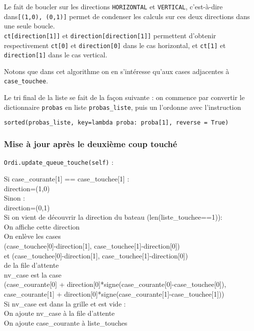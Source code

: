 Le fait de boucler sur les directions \texttt{HORIZONTAL} et \texttt{VERTICAL}, c'est-à-dire dans\texttt{[(1,0), (0,1)]} permet de condenser les calculs sur ces deux directions dans une seule boucle.\\
\texttt{ct[direction[1]]} et \texttt{direction[direction[1]]} permettent d'obtenir respectivement \texttt{ct[0]} et \texttt{direction[0]} dans le cas horizontal, et \texttt{ct[1]} et \texttt{direction[1]} dans le cas vertical.

Notons que dans cet algorithme on en s'intéresse qu'aux cases adjacentes à \texttt{case\_touchee}.

\medskip

Le tri final de la liste se fait de la façon suivante : on commence par convertir le dictionnaire \texttt{probas} en liste \texttt{probas\_liste}, puis un l'ordonne avec l'instruction
\begin{center}
\texttt{sorted(probas\_liste, key=lambda proba: proba[1], reverse = True)}
\end{center}

\newpage
\subsubsection{Mise à jour après le deuxième coup touché}\label{update_queue_touche}
\texttt{Ordi.update\_queue\_touche(self)} :
\begin{algo1}
Si case\_courante[1] == case\_touchee[1] :\\
direction=(1,0)\\
Sinon :\\
direction=(0,1)\\
Si on vient de découvrir la direction du bateau (len(liste\_touchee==1)):\\
On affiche cette direction\\
On enlève les cases \\
 (case\_touchee[0]-direction[1], case\_touchee[1]-direction[0])\\ 
et (case\_touchee[0]-direction[1], case\_touchee[1]-direction[0])\\
de la file d'attente\\
nv\_case est la case\\
(case\_courante[0] + direction[0]*signe(case\_courante[0]-case\_touchee[0]),\\
 case\_courante[1] + direction[0]*signe(case\_courante[1]-case\_touchee[1]))\\
Si nv\_case est dans la grille et est vide :\\
On ajoute nv\_case à la file d'attente\\
On ajoute case\_courante à liste\_touches\\
\end{algo1}

